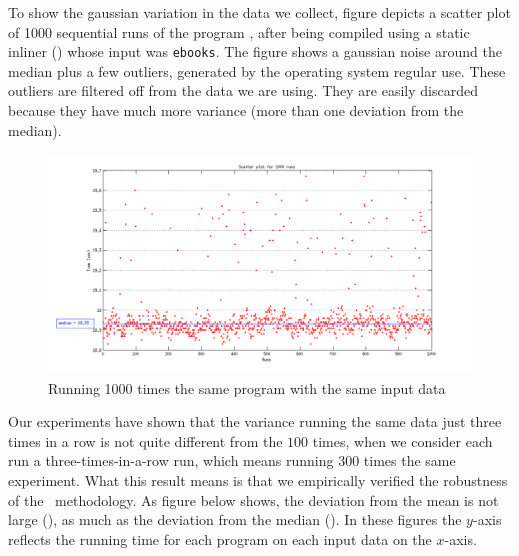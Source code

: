 
To show the gaussian variation in the data we collect, figure  depicts a scatter plot of 1000 sequential runs of the program \bzip, after being compiled using a static inliner (\llvm) whose input was {\tt ebooks}. The figure shows a gaussian noise around the median plus a few outliers, generated by the operating system regular use. These outliers are filtered off from the data we are using. They are easily discarded because they have much more variance (more than one deviation from the median).

\begin{figure}
  \centering
  \includegraphics[width=1.00\linewidth]{Figures/1000Runs}
  \caption{Running 1000 times the same program with the same input data}
  \label{fig:gauss}
\end{figure}

Our experiments have shown that the variance running the same data just three times in a row is not quite different from the $100$ times, when we consider each run a three-times-in-a-row run, which means running $300$ times the same experiment. What this result means is that we empirically verified the robustness of the \CP\ methodology. As figure  below shows, the deviation from the mean is not large (), as much as the deviation from the median ().  In these figures the $y$-axis reflects the running time for each program on each input data on the $x$-axis.

